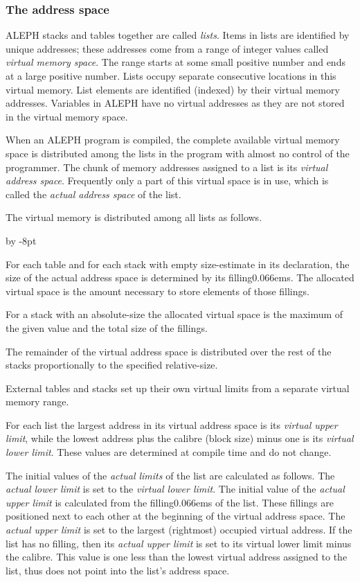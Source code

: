 \documentclass{article}
\newcommand\g[1]{{\color{blue!50!black}\sf #1}}
\renewenvironment{itemize}{\begin{list}{}{%
\advance\leftmargin by -8pt%
\setlength\itemsep{0ex plus 0.2ex}%
\setlength\partopsep{3pt}%
\setlength\topsep{2pt plus 2pt}%
\setlength\parsep{0pt plus 2pt}%
}}{\end{list}}
\renewcommand\/{\kern 0.066em}
\newcommand\A{{\sf ALEPH}}
\begin{document}
\subsubsection{The address space}\label{4.1.4}

\A{} stacks and tables together are called \emph{lists}. Items in lists are
identified by unique addresses; these addresses come from a range of integer
values called \emph{virtual memory space}. The range starts at some small
positive number and ends at a large positive number. Lists occupy separate
consecutive locations in this virtual memory. List elements are identified
(indexed) by their virtual memory addresses. Variables in \A{} have no
virtual addresses as they are not stored in the virtual memory space.

When an \A{} program is compiled, the complete available virtual memory
space is distributed among the lists in the program with almost no control
of the programmer. The chunk of memory addresses assigned to a list is its
\emph{virtual address space}. Frequently only a part of this virtual space
is in use, which is called the \emph{actual address space} of the list.

The virtual memory is distributed among all lists as follows.
\begin{itemize}
\item[a)] For each table and for each stack with empty \g{size-estimate} 
in its declaration, the
size of the actual address space is determined by its \g{filling}\/s. The
allocated virtual space is the amount necessary to store elements of those
fillings.
\item[b)] For a stack with an \g{absolute-size} the allocated virtual space
is the maximum of the given value and the total size of the fillings.
\item[c)] The remainder of the virtual address space is distributed over the
rest of the stacks proportionally to the specified \g{relative-size}.
\item[d)] External tables and stacks set up their own virtual limits from
a separate virtual memory range.
\end{itemize}
For each list the largest address in its virtual address space is its
\emph{virtual upper limit}, while the lowest address plus the \g{calibre}
(block size) minus one is its \emph{virtual lower limit}. These values are
determined at compile time and do not change.

The initial values of the \emph{actual limits} of the list are calculated as
follows. The \emph{actual lower limit} is set to the \emph{virtual lower
limit}. The initial value of the \emph{actual upper limit} is calculated
from the \g{filling}\/s of the list. These fillings are positioned next to
each other at the beginning of the virtual address space. The \emph{actual
upper limit} is set to the largest (rightmost) occupied virtual address. If
the list has no \g{filling}, then its \emph{actual upper limit} is set to
its virtual lower limit minus the \g{calibre}. This value is one less than the
lowest virtual address assigned to the list, thus does not point into the
list's address space.
\end{document}
